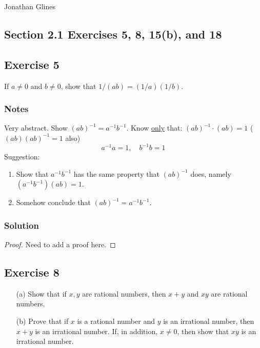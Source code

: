 \documentclass[12pt]{article}
\begin{document}
\begin{flushright}
\Large{Jonathan Glines}
\end{flushright}
\begin{flushleft}
\section*{Section 2.1 Exercises 5, 8, 15(b), and 18}
\subsection*{Exercise 5}
If $a \ne 0$ and $b \ne 0$, show that $1/\left(ab\right) = \left(1/a\right)\left(1/b\right)$.

\subsubsection*{Notes}
Very abstract. Show $\left(ab\right)^{-1} = a^{-1}b^{-1}$. Know \underline{only} that: $\left(ab\right)^{-1}\cdot\left(ab\right) = 1$ ($(ab)(ab)^{-1} = 1$ also)
\[
a^{-1} a = 1,\quad
b^{-1} b = 1
\]
Suggestion:
\begin{enumerate}
\item Show that $a^{-1}b^{-1}$ has the same property that $(ab)^{-1}$ does, namely $(a^{-1}b^{-1})(ab) = 1$.
\item Somehow conclude that $(ab)^{-1} = a^{-1}b^{-1}$.
\end{enumerate}

\subsubsection*{Solution}
\begin{proof}
Need to add a proof here.
\end{proof}

\subsection*{Exercise 8}
\begin{itemize}
\item[(a)] Show that if $x, y$ are rational numbers, then $x + y$ and $xy$ are rational numbers.
\item[(b)] Prove that if $x$ is a rational number and $y$ is an irrational number, then $x + y$ is an irrational number. If, in addition, $x \neq 0$, then show that $xy$ is an irrational number.
\end{itemize}


\end{flushleft}
\end{document}
